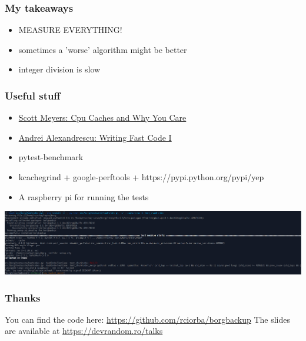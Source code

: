 \documentclass{beamer}
\begin{document}
\begin{frame}
  \frametitle{My takeaways}
  \begin{itemize}
  \item MEASURE EVERYTHING!
  \item sometimes a 'worse' algorithm might be better
  \item integer division is slow
  \end{itemize}
\end{frame}

\begin{frame}
  \frametitle{Useful stuff}
  \begin{itemize}
  \item  \href{https://www.youtube.com/watch?v=WDIkqP4JbkE}{Scott Meyers: Cpu Caches and Why You Care}
  \item  \href{https://www.youtube.com/watch?v=vrfYLlR8X8k}{Andrei Alexandrescu: Writing Fast Code I}
  \item pytest-benchmark
  \item kcachegrind + google-perftools + https://pypi.python.org/pypi/yep
  \item A raspberry pi for running the tests

  \end{itemize}
\end{frame}

\begin{frame}
 \begin{center}
 \includegraphics[scale=0.26,keepaspectratio=true]{./sigabrt.png}
 \end{center}
\end{frame}

\begin{frame}
  \frametitle{Thanks}
  You can find the code here:
  \href{https://github.com/rciorba/borgbackup}{https://github.com/rciorba/borgbackup}
  \newline
  \newline
  The slides are available at
  \href{https://devrandom.ro/talks}{https://devrandom.ro/talks}
\end{frame}
\end{document}
